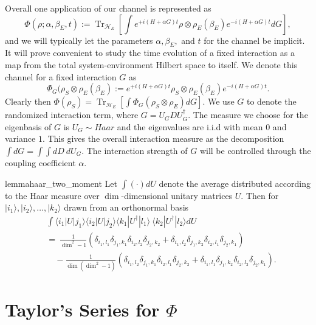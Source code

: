 \documentclass{article}
\newcommand{\ket}[1]{|#1\rangle}
\newcommand{\bra}[1]{\langle #1|}
\newcommand{\parens}[1]{\left( #1 \right)}
\newcommand{\brackets}[1]{\left[ #1 \right]}
\DeclareMathOperator{\Tr}{Tr}
\newcommand{\partrace}[2]{\Tr_{#1} \brackets{ #2 }}
\newcommand{\hilb}{\mathcal{H}}
\begin{document}
Overall one application of our channel is represented as
\begin{equation}
    \Phi(\rho ; \alpha, \beta_E, t) :=  \partrace{\hilb_E}{\int e^{+i(H + \alpha G)t} \rho \otimes \rho_E(\beta_E) e^{-i(H + \alpha G) t} dG},
\end{equation}
and we will typically let the parameters $\alpha, \beta_E,$ and $t$ for the channel be implicit. It will prove convenient to study the time evolution of a fixed interaction as a map from the total system-environment Hilbert space to itself. We denote this channel for a fixed interaction $G$ as
\begin{equation}
    \Phi_G(\rho_S \otimes \rho_E(\beta_E) := e^{+i (H+ \alpha G) t} \rho_S \otimes \rho_E(\beta_E) e^{-i (H + \alpha G) t}. \label{eq:phi_g_definition}
\end{equation}
Clearly then $\Phi(\rho_S) = \partrace{\hilb_E}{\int \Phi_G (\rho_S \otimes \rho_E) dG}$. We use $G$ to denote the randomized interaction term, where $G = U_G D U_G^\dagger$. The measure we choose for the eigenbasis of $G$ is $U_G \sim Haar$ and the eigenvalues are i.i.d with mean 0 and variance $1$.  This gives the overall interaction measure as the decomposition $\int dG = \int \int dD ~ dU_G$. The interaction strength of $G$ will be controlled through the coupling coefficient $\alpha$.

\begin{restatable}{lemma}{haar_two_moment} \label{lem:haar_two_moment}
    Let $\int (\cdot) dU$ denote the average distributed according to the Haar measure over $\dim$-dimensional unitary matrices $U$. Then for $\ket{i_1},\ket{i_2},\ldots,\ket{k_2}$ drawn from an orthonormal basis
    \begin{align}
        &\int \bra{i_1} U \ket{j_1} \bra{i_2} U \ket{j_2} \bra{k_1} U^\dagger \ket{l_1} ~ \bra{k_2} U^\dagger \ket{l_2} dU \nonumber \\
        &= ~\frac{1}{\dim^2 - 1} \parens{\delta_{i_1, l_1} \delta_{j_1, k_1} \delta_{i_2, l_2} \delta_{j_2, k_2} + \delta_{i_1, l_2} \delta_{j_1, k_2} \delta_{i_2, l_1} \delta_{j_2, k_1}} \nonumber \\
        &\quad - \frac{1}{\dim(\dim^2 - 1)} \parens{\delta_{i_1, l_2} \delta_{j_1, k_1} \delta_{i_2, l_1} \delta_{j_2, k_2} + \delta_{i_1, l_1} \delta_{j_1, k_2} \delta_{i_2, l_2} \delta_{j_2, k_1}}. \label{eq:haar_two_moment_integral}
    \end{align}
\end{restatable}


\section{Taylor's Series for $\Phi$} \label{sec:taylor_series_phi}
\end{document}
